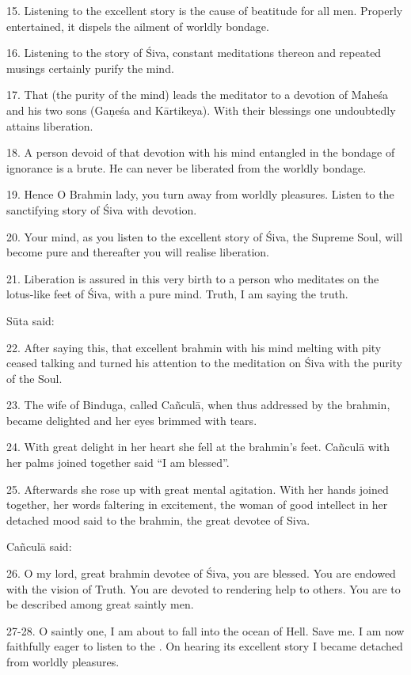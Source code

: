 15. Listening to the excellent story is the cause of beatitude for all men.
Properly entertained, it dispels the ailment of worldly bondage.

16. Listening to the story of Śiva, constant meditations thereon and repeated
musings certainly purify the mind.

17. That (the purity of the mind) leads the meditator to a devotion of Maheśa
and his two sons (Gaṇeśa and Kārtikeya). With their blessings one undoubtedly
attains liberation.

18. A person devoid of that devotion with his mind entangled in the bondage of
ignorance is a brute. He can never be liberated from the worldly bondage.

19. Hence O Brahmin lady, you turn away from worldly pleasures. Listen to the
sanctifying story of Śiva with devotion.

20. Your mind, as you listen to the excellent story of Śiva, the Supreme Soul,
will become pure and thereafter you will realise liberation.

21. Liberation is assured in this very birth to a person who meditates on the
lotus-like feet of Śiva, with a pure mind. Truth, I am saying the truth.

Sūta said:

22. After saying this, that excellent brahmin with his mind melting with pity
ceased talking and turned his attention to the meditation on Śiva with the
purity of the Soul.

23. The wife of Binduga, called Cañculā, when thus addressed by the brahmin,
became delighted and her eyes brimmed with tears.

24. With great delight in her heart she fell at the brahmin’s feet. Cañculā with
her palms joined together said “I am blessed”.

25. Afterwards she rose up with great mental agitation. With her hands joined
together, her words faltering in excitement, the woman of good intellect in her
detached mood said to the brahmin, the great devotee of Siva.

Cañculā said:

26. O my lord, great brahmin devotee of Śiva, you are blessed. You are endowed
with the vision of Truth. You are devoted to rendering help to others. You are
to be described among great saintly men.

27-28. O saintly one, I am about to fall into the ocean of Hell. Save me. I am
now faithfully eager to listen to the . On hearing its excellent
story I became detached from worldly pleasures.

